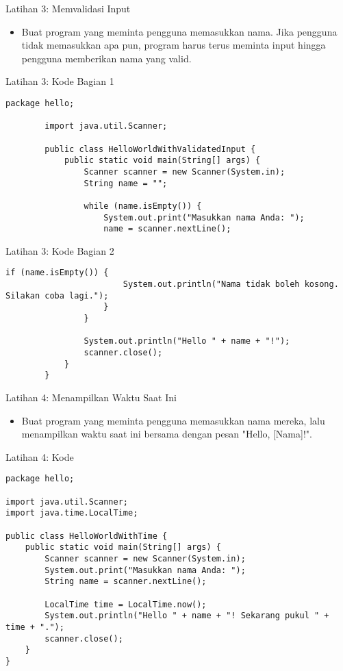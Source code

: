\documentclass[aspectratio=169, table]{beamer}
\begin{document}
\begin{frame}[fragile]{Latihan 3: Memvalidasi Input}
\begin{itemize}
\item Buat program yang meminta pengguna memasukkan nama. Jika pengguna tidak memasukkan apa pun, program harus terus meminta input hingga pengguna memberikan nama yang valid.
\end{itemize}
\end{frame}

\begin{frame}[fragile]{Latihan 3: Kode Bagian 1}
	\begin{lstlisting}[style=JavaStyle, firstnumber=1]
		package hello;
		
		import java.util.Scanner;
		
		public class HelloWorldWithValidatedInput {
			public static void main(String[] args) {
				Scanner scanner = new Scanner(System.in);
				String name = "";
				
				while (name.isEmpty()) {
					System.out.print("Masukkan nama Anda: ");
					name = scanner.nextLine();
				\end{lstlisting}
			\end{frame}
			
			\begin{frame}[fragile]{Latihan 3: Kode Bagian 2}
				\begin{lstlisting}[style=JavaStyle, firstnumber=11]
					if (name.isEmpty()) {
						System.out.println("Nama tidak boleh kosong. Silakan coba lagi.");
					}
				}
				
				System.out.println("Hello " + name + "!");
				scanner.close();
			}
		}
	\end{lstlisting}
\end{frame}

\begin{frame}[fragile]{Latihan 4: Menampilkan Waktu Saat Ini}
\begin{itemize}
\item Buat program yang meminta pengguna memasukkan nama mereka, lalu menampilkan waktu saat ini bersama dengan pesan "Hello, [Nama]!".
\end{itemize}
\end{frame}

\begin{frame}[fragile]{Latihan 4: Kode}
\vspace{15pt}
\begin{lstlisting}[style=JavaStyle]
package hello;

import java.util.Scanner;
import java.time.LocalTime;

public class HelloWorldWithTime {
	public static void main(String[] args) {
		Scanner scanner = new Scanner(System.in);
		System.out.print("Masukkan nama Anda: ");
		String name = scanner.nextLine();
		
		LocalTime time = LocalTime.now();
		System.out.println("Hello " + name + "! Sekarang pukul " + time + ".");
		scanner.close();
	}
}
\end{lstlisting}
\end{frame}
\end{document}
